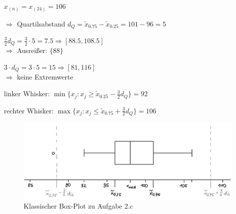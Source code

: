 $x_{(n)} = x_{(24)} = 106$

\vspace{0.5cm}

$\Rightarrow$ Quartilsabstand $d_Q = \tilde{x}_{0.75} - \tilde{x}_{0.25} = 101 - 96 = 5$

$\frac32 d_Q = \frac32\cdot5 = 7.5 \Rightarrow [88.5, 108.5]$ \\
$\Rightarrow$ Ausreißer: $\lbrace 88 \rbrace$

$3\cdot d_Q = 3\cdot5 = 15 \Rightarrow [81, 116]$ \\
$\Rightarrow$ keine Extremwerte

\vspace{0.5cm}

linker Whisker: $\min\lbrace x_j : x_j \ge \tilde{x}_{0.25} - \frac32 d_Q \rbrace = 92$

rechter Whisker: $\max\lbrace x_j : x_j \le \tilde{x}_{0.75} + \frac32 d_Q \rbrace = 106$

\begin{figure}[H]
    \centering
    \includegraphics[width=\textwidth]{assets/task2_box_plot.jpeg}
    \caption{Klassischer Box-Plot zu Aufgabe 2.c}
\end{figure}

